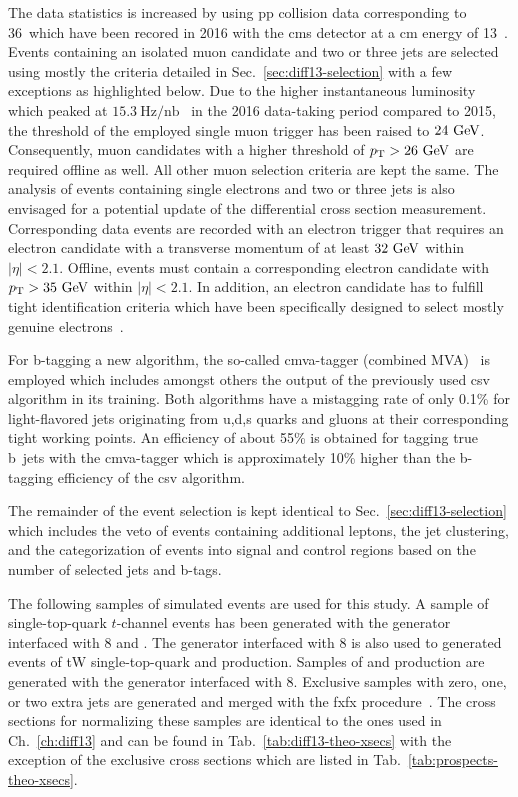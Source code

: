The data statistics is increased by using \gls{pp} collision data corresponding to 36~\invfb which have been recored in 2016 with the \gls{cms} detector at a \acrlong{cm} energy of 13~\TeV. Events containing an isolated muon candidate and two or three jets are selected using mostly the criteria detailed in Sec.~\ref{sec:diff13-selection} with a few exceptions as highlighted below. Due to the higher instantaneous luminosity which peaked at $15.3~\mathrm{Hz}/\mathrm{nb}$~\cite{lumipublic} in the 2016 data-taking period compared to 2015, the threshold of the employed single muon trigger has been raised to $24~\textrm{GeV}$. Consequently, muon candidates with a higher threshold of $p_\textrm{T}>26~\textrm{GeV}$ are required offline as well. All other muon selection criteria are kept the same. The analysis of events containing single electrons and two or three jets is also envisaged for a potential update of the differential cross section measurement. Corresponding data events are recorded with an electron trigger that requires an electron candidate with a transverse momentum of at least $32~\textrm{GeV}$ within $|\eta|<2.1$. Offline, events must contain a corresponding electron candidate with $p_\textrm{T}>35~\textrm{GeV}$ within $|\eta|<2.1$. In addition, an electron candidate has to fulfill tight identification criteria which have been specifically designed to select mostly genuine electrons~\cite{CMS-DP-2017-004}.

For b-tagging a new algorithm, the so-called \gls{cmva}-tagger (combined MVA)~\cite{CMS-PAS-BTV-15-001} is employed which includes amongst others the output of the previously used \gls{csv} algorithm in its training. Both algorithms have a mistagging rate of only 0.1\% for light-flavored jets originating from u,d,s quarks and gluons at their corresponding tight working points. An efficiency of about 55\% is obtained for tagging true b~jets with the \gls{cmva}-tagger which is approximately 10\% higher than the b-tagging efficiency of the \gls{csv} algorithm. 

The remainder of the event selection is kept identical to Sec.~\ref{sec:diff13-selection} which includes the veto of events containing additional leptons, the jet clustering, and the categorization of events into signal and control regions based on the number of selected jets and b-tags.

The following samples of simulated events are used for this study. A sample of single-top-quark $t$-channel events has been generated with the \POWHEG generator interfaced with \PYTHIA{}8 and \MADSPIN. The \POWHEG generator interfaced with \PYTHIA{}8 is also used to generated events of tW single-top-quark and \ttbar production. Samples of \wjets and \zjets production are generated with the \MGAMC generator interfaced with \PYTHIA{}8. Exclusive \wjets samples with zero, one, or two extra jets are generated and merged with the \gls{fxfx} procedure~\cite{Frederix:2012ps}. The cross sections for normalizing these samples are identical to the ones used in Ch.~\ref{ch:diff13} and can be found in Tab.~\ref{tab:diff13-theo-xsecs} with the exception of the exclusive \wjets cross sections which are listed in Tab.~\ref{tab:prospects-theo-xsecs}.

